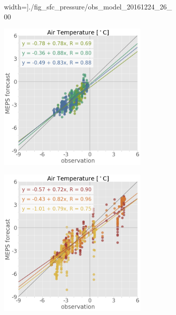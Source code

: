 \begin{figure}[t!]
\begin{subfigure}[b]{0.49\textwidth}
		width=\textwidth]{./fig_sfc_pressure/obs_model_20161224_26_00}
		\caption{}\label{fig:scat:pres2426}
	\end{subfigure}
	\begin{subfigure}[b]{0.49\textwidth}
		\centering
		\includegraphics[trim={25.cm 15.5cm 0cm 3.6cm},clip,
		width=0.8\textwidth]{./fig_sfc_temp/obs_model_20161221_23_00}
	\end{subfigure}
	\begin{subfigure}[b]{0.49\textwidth}
		\centering
		\includegraphics[trim={25.cm 15.5cm 0cm 3.6cm},clip,
		width=0.8\textwidth]{./fig_sfc_temp/obs_model_20161224_26_00}

\end{subfigure}
\end{figure}
